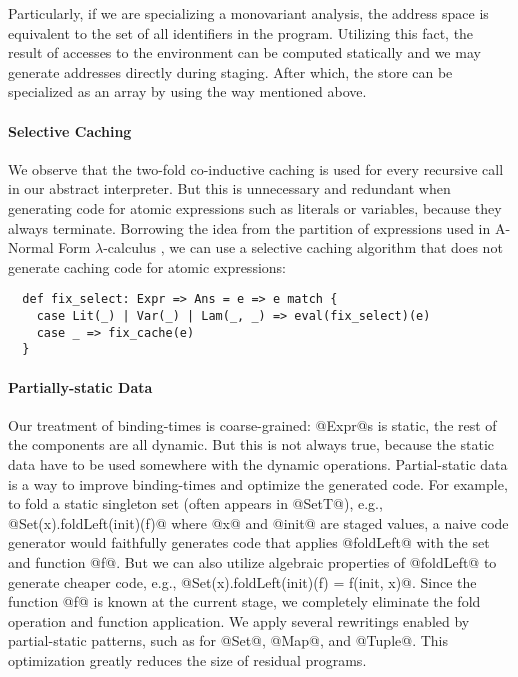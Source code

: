 Particularly, if we are specializing a monovariant analysis, the address space
is equivalent to the set of all identifiers in the program. Utilizing this fact, the
result of accesses to the environment can be computed statically and we may
generate addresses directly during staging. After which, the store can be
specialized as an array by using the way mentioned above.

\paragraph{Selective Caching} We observe that the two-fold co-inductive
caching is used for every recursive call in our abstract interpreter. But this
is unnecessary and redundant when generating code for atomic
expressions such as literals or variables, because they always terminate.
Borrowing the idea from the partition of expressions used in A-Normal Form
$\lambda$-calculus \cite{Flanagan:1993:ECC:155090.155113}, we can use a
selective caching algorithm that does not generate caching code for atomic
expressions:
\begin{lstlisting}
  def fix_select: Expr => Ans = e => e match {
    case Lit(_) | Var(_) | Lam(_, _) => eval(fix_select)(e)
    case _ => fix_cache(e)
  }
\end{lstlisting}

\paragraph{Partially-static Data}
Our treatment of binding-times is coarse-grained: @Expr@s is static, the rest
of the components are all dynamic. But this is not always true, because the
static data have to be used somewhere with the dynamic operations.
Partial-static data is a way to improve binding-times and optimize the
generated code.
For example, to fold a static singleton set (often appears in @SetT@), e.g.,
@Set(x).foldLeft(init)(f)@ where @x@ and @init@ are staged values, a naive code
generator would faithfully generates code that applies @foldLeft@ with the set
and function @f@. But we can also utilize algebraic properties of @foldLeft@
to generate cheaper code, e.g., @Set(x).foldLeft(init)(f) = f(init, x)@. Since the
function @f@ is known at the current stage, we completely eliminate the fold
operation and function application. We apply several rewritings enabled by
partial-static patterns, such as for @Set@, @Map@, and @Tuple@. This
optimization greatly reduces the size of residual programs.

